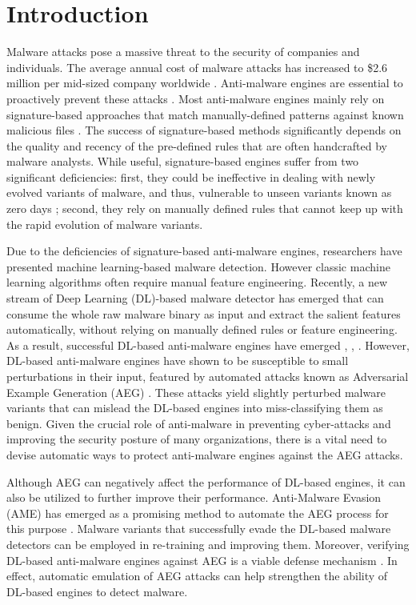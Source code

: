 \documentclass[letterpaper]{article}
\begin{document}
\section{Introduction}
\label{introduction}
\noindent Malware attacks pose a massive threat to the security of companies and individuals. The average annual cost of malware attacks has increased to \$2.6 million per mid-sized company worldwide \cite{bissell2019}. Anti-malware engines are essential to proactively prevent these attacks  \cite{tounsi2018survey}. Most anti-malware engines mainly rely on signature-based approaches that match manually-defined patterns against known malicious files \cite{anderson2018learning}. The success of signature-based methods significantly depends on the quality and recency of the pre-defined rules that are often handcrafted by malware analysts. While useful, signature-based engines suffer from two significant deficiencies: first, they could be ineffective in dealing with newly evolved variants of malware, and thus, vulnerable to unseen variants known as zero days \cite{chenB2019adversarial}; second, they rely on manually defined rules that cannot keep up with the rapid evolution of malware variants.
    
Due to the deficiencies of signature-based anti-malware engines, researchers have  presented machine learning-based malware detection. However classic machine learning algorithms often require manual feature engineering. Recently, a new stream of Deep Learning (DL)-based malware detector has emerged that can consume the whole raw malware binary as input and extract the salient features automatically, without relying on manually defined rules or feature engineering. As a result, successful DL-based anti-malware engines have emerged \cite{raff2018malware}, \cite{fleshman2019non}, \cite{krvcal2018deep}. However, DL-based anti-malware engines have shown to be susceptible to small perturbations in their input, featured by automated attacks known as Adversarial Example Generation (AEG) \cite{demetrio2019explaining}. These attacks yield slightly perturbed malware variants that can mislead the DL-based engines into miss-classifying them as benign. Given the crucial role of anti-malware in preventing cyber-attacks and improving the security posture of many organizations, there is a vital need to devise automatic ways to protect anti-malware engines against the AEG attacks.

Although AEG can negatively affect the performance of DL-based engines, it can also be utilized to further improve their performance. Anti-Malware Evasion (AME) has emerged as a promising method to automate the AEG process for this purpose \cite{chenY2019training}. Malware variants that successfully evade the DL-based malware detectors can be employed in re-training and improving them. Moreover, verifying DL-based anti-malware engines against AEG is a viable defense mechanism \cite{goodfellow2018making}. In effect, automatic emulation of AEG attacks can help strengthen the ability of DL-based engines to detect malware.
    
\end{document}
